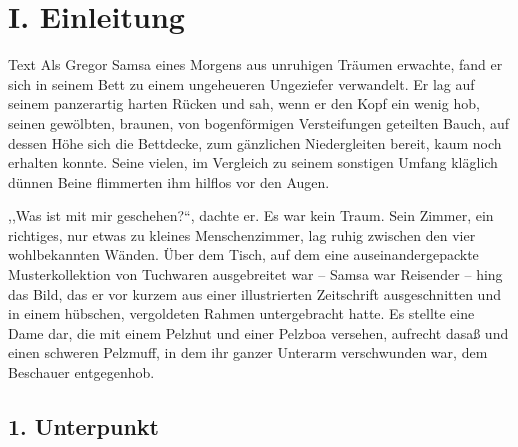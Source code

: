 \documentclass[]{zchinr}
\begin{document}

\printtitle

\printissuetoc



\printtitle

\section{I. Einleitung}

Text Als Gregor Samsa eines Morgens aus unruhigen Träumen erwachte, fand er sich in seinem Bett zu einem ungeheueren Ungeziefer verwandelt. Er lag auf seinem panzerartig harten Rücken und sah, wenn er den Kopf ein wenig hob, seinen gewölbten, braunen, von bogenförmigen Versteifungen geteilten Bauch, auf dessen Höhe sich die Bettdecke, zum gänzlichen Niedergleiten bereit, kaum noch erhalten konnte. Seine vielen, im Vergleich zu seinem sonstigen Umfang kläglich dünnen Beine flimmerten ihm hilflos vor den Augen.

,,Was ist mit mir geschehen?{}``, dachte er. Es war kein Traum. Sein Zimmer, ein richtiges, nur etwas zu kleines Menschenzimmer, lag ruhig zwischen den vier wohlbekannten Wänden. Über dem Tisch, auf dem eine auseinandergepackte Musterkollektion von Tuchwaren ausgebreitet war -- Samsa war Reisender -- hing das Bild, das er vor kurzem aus einer illustrierten Zeitschrift ausgeschnitten und in einem hübschen, vergoldeten Rahmen untergebracht hatte. Es stellte eine Dame dar, die mit einem Pelzhut und einer Pelzboa versehen, aufrecht dasaß und einen schweren Pelzmuff, in dem ihr ganzer Unterarm verschwunden war, dem Beschauer entgegenhob.

\subsection{1. Unterpunkt}
\end{document}
